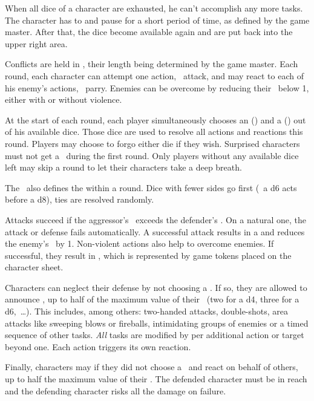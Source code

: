 {		When all dice of a character are exhausted, he can't accomplish any more tasks. The character has to  and pause for a short period of time, as defined by the game master. After that, the dice become available again and are put back into the upper right area.


		\noindent
		Conflicts are held in , their length being determined by the game master. Each round, each character can attempt one action, \eg\ attack, and may react to each of his enemy's actions, \eg\ parry. Enemies can be overcome by reducing their \HD\ below 1, either with or without violence.

		At the start of each round, each player simultaneously chooses an  (\AD) and a  (\RD) out of his available dice. Those dice are used to resolve all actions and reactions this round. Players may choose to forgo either die if they wish. Surprised characters must not get a \AD\ during the first round. Only players without any available dice left may skip a round to let their characters take a deep breath.

		The \AD\ also defines the  within a round. Dice with fewer sides go first (\eg\ a d6 acts before a d8), ties are resolved randomly.

		Attacks succeed if the aggressor's \AD\ exceeds the defender's \RD. On a natural one, the attack or defense fails automatically. A successful attack results in a  and reduces the enemy's \HD\ by 1. Non-violent actions also help to overcome enemies. If successful, they result in , which is represented by game tokens placed on the character sheet.

		Characters can neglect their defense by not choosing a \RD. If so, they are allowed to announce , up to half of the maximum value of their \AD~(two for a d4, three for a d6,~\ldots). This includes, among others: two-handed attacks, double-shots, area attacks like sweeping blows or fireballs, intimidating groups of enemies or a timed sequence of other tasks. \emph{All} tasks are modified by  per additional action or target beyond one. Each action triggers its own reaction.

		Finally, characters may  if they did not choose a \AD\ and react on behalf of others, up to half the maximum value of their \RD. The defended character must be in reach and the defending character risks all the damage on failure.

}
